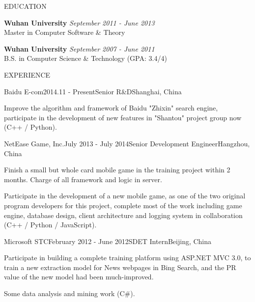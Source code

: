 \documentclass{resume} %
\begin{document}
\begin{rSection}{EDUCATION}

{\bf Wuhan University} \hfill {\em September 2011 - June 2013} \\
Master in Computer Software \& Theory
\vspace{0.3em}

{\bf Wuhan University} \hfill {\em September 2007 - June 2011} \\
B.S. in Computer Science \& Technology (GPA: 3.4/4)
\vspace{0.5em}

\end{rSection}

\begin{rSection}{EXPERIENCE}

\begin{rSubsection}{Baidu E-com}{2014.11 - Present}{Senior R\&D}{Shanghai, China}
\item Improve the algorithm and framework of Baidu "Zhixin" search engine, participate in the development of new features in "Shantou" project group now (C++ / Python).
\end{rSubsection}

\begin{rSubsection}{NetEase Game, Inc.}{July 2013 - July 2014}{Senior Development Engineer}{Hangzhou, China}
\item Finish a small but whole card mobile game in the training project within 2 months. Charge of all framework and logic in server.
\item Participate in the development of a new mobile game, as one of the two original program developers for this project, complete most of the work including game engine, database design, client architecture and logging system in collaboration (C++ / Python / JavaScript).

\end{rSubsection}
\begin{rSubsection}{Microsoft STC}{February 2012 - June 2012}{SDET Intern}{Beijing, China}
\item Participate in building a complete training platform using ASP.NET MVC 3.0, to train a new extraction model for News webpages in Bing Search, and the PR value of the new model had been much-improved.
\item Some data analysis and mining work (C\#).
\end{rSubsection}

\end{rSection}
\end{document}

